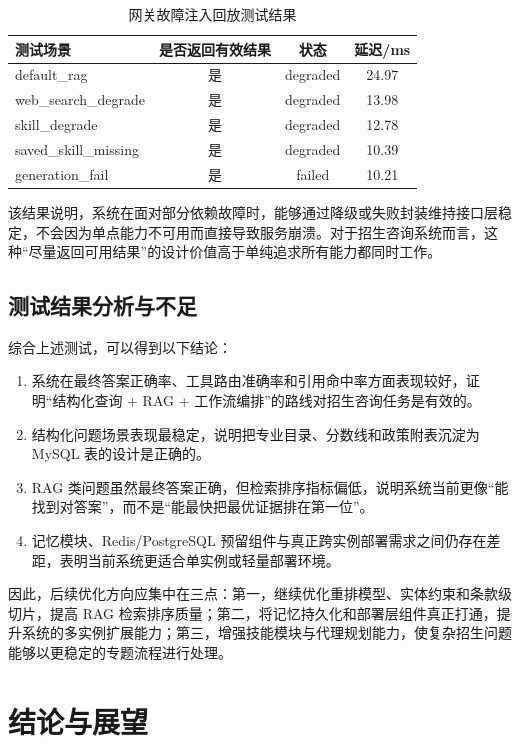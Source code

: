 \documentclass[UTF8,zihao=-4,oneside,fontset=windows]{ctexbook}
\numberwithin{equation}{chapter}
\begin{document}
\begin{table}[H]
  \centering
  \caption{网关故障注入回放测试结果}
  \begin{tabularx}{0.95\textwidth}{>{\raggedright\arraybackslash}X c c c}
    \toprule
    测试场景 & 是否返回有效结果 & 状态 & 延迟/ms \\
    \midrule
    default\_rag & 是 & degraded & 24.97 \\
    web\_search\_degrade & 是 & degraded & 13.98 \\
    skill\_degrade & 是 & degraded & 12.78 \\
    saved\_skill\_missing & 是 & degraded & 10.39 \\
    generation\_fail & 是 & failed & 10.21 \\
    \bottomrule
  \end{tabularx}
\end{table}

该结果说明，系统在面对部分依赖故障时，能够通过降级或失败封装维持接口层稳定，不会因为单点能力不可用而直接导致服务崩溃。对于招生咨询系统而言，这种“尽量返回可用结果”的设计价值高于单纯追求所有能力都同时工作。

\section{测试结果分析与不足}
综合上述测试，可以得到以下结论：

\begin{enumerate}
  \item 系统在最终答案正确率、工具路由准确率和引用命中率方面表现较好，证明“结构化查询 + RAG + 工作流编排”的路线对招生咨询任务是有效的。
  \item 结构化问题场景表现最稳定，说明把专业目录、分数线和政策附表沉淀为 MySQL 表的设计是正确的。
  \item RAG 类问题虽然最终答案正确，但检索排序指标偏低，说明系统当前更像“能找到对答案”，而不是“能最快把最优证据排在第一位”。
  \item 记忆模块、Redis/PostgreSQL 预留组件与真正跨实例部署需求之间仍存在差距，表明当前系统更适合单实例或轻量部署环境。
\end{enumerate}

因此，后续优化方向应集中在三点：第一，继续优化重排模型、实体约束和条款级切片，提高 RAG 检索排序质量；第二，将记忆持久化和部署层组件真正打通，提升系统的多实例扩展能力；第三，增强技能模块与代理规划能力，使复杂招生问题能够以更稳定的专题流程进行处理。

\chapter{结论与展望}
\end{document}
